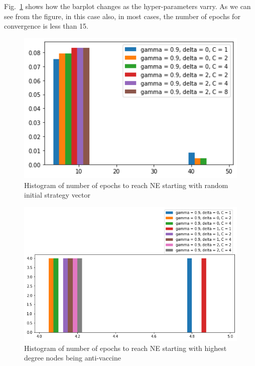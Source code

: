 Fig.~\ref{fig:exp1-diff-params} shows how the barplot changes as the hyper-parameters varry. As we can see from the figure, in this case also, in most cases, the number of epochs for convergence is less than 15.

\begin{figure}[H]
    \centering
    \includegraphics[width=12cm]{figs/exp1-diff-params.png}
    \caption{Histogram of number of epochs to reach NE starting with random initial strategy vector}
    \label{fig:exp1-diff-params}
\end{figure}




\begin{figure}[H]
    \centering
    \includegraphics[width=14cm]{figs/exp1-diff-params-degree.png}
    \caption{Histogram of number of epochs to reach NE starting with highest degree nodes being anti-vaccine}
    \label{fig:exp1-diff-params-degree}
\end{figure}

